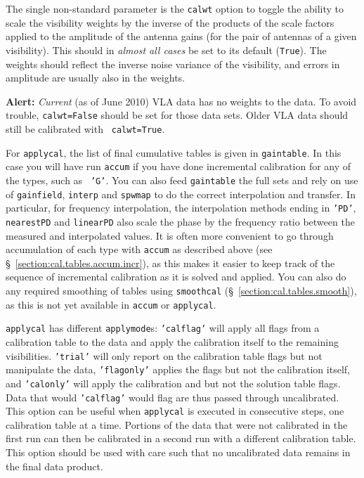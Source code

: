 The single non-standard parameter is the {\tt calwt} option to toggle
the ability to scale the visibility weights by the inverse of the 
products of the scale factors applied to the amplitude of the antenna
gains (for the pair of antennas of a given visibility).  
This should in {\em almost all cases} be set to its default ({\tt True}).
The weights should reflect the inverse noise variance of the
visibility, and errors in amplitude are usually also in the weights.


{\bf Alert:} {\it Current} (as of June 2010) VLA data has no weights
to the data. To avoid trouble, {\tt calwt=False} should be set for
those data sets. Older VLA data should still be calibrated with {\tt
  calwt=True}.

For {\tt applycal}, the list of final cumulative tables is given in
{\tt gaintable}.  In this case you will have run {\tt accum} if you
have done incremental calibration for any of the types, such as {\tt
  'G'}.  You can also feed {\tt gaintable} the full sets and rely on
use of {\tt gainfield}, {\tt interp} and {\tt spwmap} to do the
correct interpolation and transfer.  In particular, for frequency
interpolation, the interpolation methods ending in {\tt 'PD'}, {\tt
  nearestPD} and {\tt linearPD} also scale the phase by the frequency
ratio between the measured and interpolated values. It is often more
convenient to go through accumulation of each type with {\tt accum} as
described above (see \S~\ref{section:cal.tables.accum.incr}), as this
makes it easier to keep track of the sequence of incremental
calibration as it is solved and applied.  You can also do any required
smoothing of tables using {\tt smoothcal}
(\S~\ref{section:cal.tables.smooth}), as this is not yet available in
{\tt accum} or {\tt applycal}.


{\tt applycal} has different {\tt applymode}s: {\tt 'calflag'} will
apply all flags from a calibration table to the data and apply the
calibration itself to the remaining visibilities. {\tt 'trial'} will
only report on the calibration table flags but not manipulate the
data, {\tt 'flagonly'} applies the flags but not the calibration
itself, and {\tt 'calonly'} will apply the calibration and but not the
solution table flags. Data that would {\tt 'calflag'} would flag are
thus passed through uncalibrated. This option can be useful when
{\tt applycal} is executed in consecutive steps, one calibration table
at a time. Portions of the data that were not calibrated in the first
run can then be calibrated in a second run with a different
calibration table. This option should be used with care such that no
uncalibrated data remains in the final data product. 


